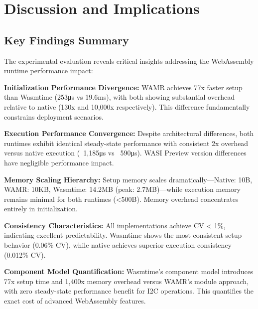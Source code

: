 

\section{Discussion and Implications}
\label{sec:eval-discussion}

\subsection{Key Findings Summary}
\label{subsec:eval-discussion-keyfindings}

The experimental evaluation reveals critical insights addressing the WebAssembly runtime performance impact:

\textbf{Initialization Performance Divergence:}
WAMR achieves 77x faster setup than Wasmtime (253μs vs 19.6ms), with both showing substantial overhead relative to native (130x and 10,000x respectively). This difference fundamentally constrains deployment scenarios.

\textbf{Execution Performance Convergence:}  
Despite architectural differences, both runtimes exhibit identical steady-state performance with consistent 2x overhead versus native execution (~1,185μs vs ~590μs). WASI Preview version differences have negligible performance impact.

\textbf{Memory Scaling Hierarchy:}
Setup memory scales dramatically—Native: 10B, WAMR: 10KB, Wasmtime: 14.2MB (peak: 2.7MB)—while execution memory remains minimal for both runtimes (<500B). Memory overhead concentrates entirely in initialization.

\textbf{Consistency Characteristics:}
All implementations achieve CV < 1\%, indicating excellent predictability. Wasmtime shows the most consistent setup behavior (0.06\% CV), while native achieves superior execution consistency (0.012\% CV).

\textbf{Component Model Quantification:}
Wasmtime's component model introduces 77x setup time and 1,400x memory overhead versus WAMR's module approach, with zero steady-state performance benefit for I2C operations. This quantifies the exact cost of advanced WebAssembly features.

